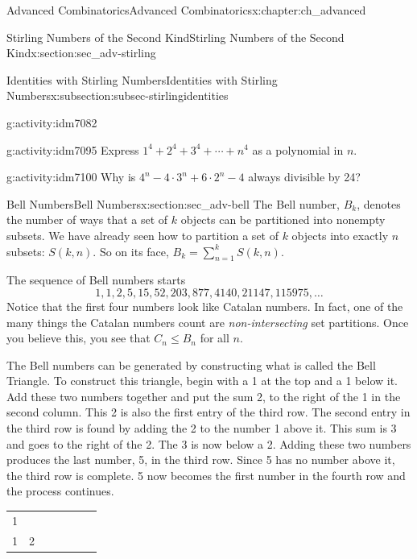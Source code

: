 \documentclass[oneside,10pt,]{book}
\numberwithin{equation}{chapter}
\begin{document}
\begin{chapterptx}{Advanced Combinatorics}{}{Advanced Combinatorics}{}{}{x:chapter:ch_advanced}
\begin{sectionptx}{Stirling Numbers of the Second Kind}{}{Stirling Numbers of the Second Kind}{}{}{x:section:sec_adv-stirling}
\begin{subsectionptx}{Identities with Stirling Numbers}{}{Identities with Stirling Numbers}{}{}{x:subsection:subsec-stirlingidentities}
\begin{activity}{}{g:activity:idm7082}
\end{activity}
\begin{activity}{}{g:activity:idm7095}%
Express \(1^4 + 2^4 + 3^4 + \cdots + n^4\) as a polynomial in \(n\).%
\end{activity}
\begin{activity}{}{g:activity:idm7100}%
Why is \(4^n - 4\cdot 3^n + 6\cdot 2^n - 4\) always divisible by 24?%
\end{activity}
\end{subsectionptx}
\end{sectionptx}
%
%
\typeout{************************************************}
\typeout{************************************************}
%
\begin{sectionptx}{Bell Numbers}{}{Bell Numbers}{}{}{x:section:sec_adv-bell}
The Bell number, \(B_{k}\), denotes the number of ways that a set of \(k\) objects can be partitioned into nonempty subsets. We have already seen how to partition a set of \(k\) objects into exactly \(n\) subsets: \(S(k,n)\).  So on its face, \(B_k = \sum_{n=1}^kS(k,n)\).%
\par
The sequence of Bell numbers starts%
\begin{equation*}
1, 1, 2, 5, 15, 52, 203, 877, 4140, 21147, 115975, \ldots
\end{equation*}
Notice that the first four numbers look like Catalan numbers.  In fact, one of the many things the Catalan numbers count are \emph{non-intersecting} set partitions.  Once you believe this, you see that \(C_n \le B_n\) for all \(n\).%
\par
The Bell numbers can be generated by constructing what is called the Bell Triangle. To construct this triangle, begin with a 1 at the top and a 1 below it. Add these two numbers together and put the sum 2, to the right of the 1 in the second column. This 2 is also the first entry of the third row. The second entry in the third row is found by adding the 2 to the number 1 above it. This sum is 3 and goes to the right of the 2. The 3 is now below a 2. Adding these two numbers produces the last number, 5, in the third row. Since 5 has no number above it, the third row is complete. 5 now becomes the first number in the fourth row and the process continues.%
\begin{sidebyside}{1}{0.15}{0.15}{0}%
\begin{sbspanel}{0.7}%
{\centering%
\begin{tabular}{lllllll}
1&&&&&&\tabularnewline[0pt]
1&2&&&&&\tabularnewline[0pt]

\end{tabular}}
\end{sbspanel}
\end{sidebyside}
\end{sectionptx}
\end{chapterptx}
\end{document}
